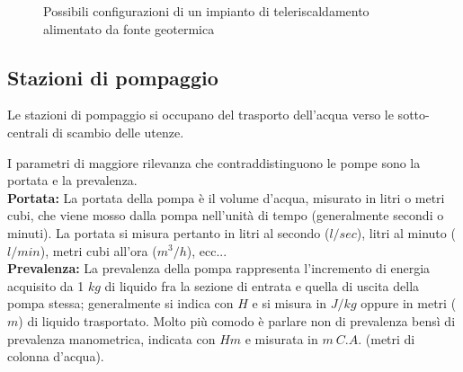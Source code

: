 \documentclass[laurea,oneside,11pt]{USiena_tesiLM}
\begin{document}
 \begin{figure}[!ht]
 \centering
 \hspace{5mm}
 \caption{Possibili configurazioni di un impianto di teleriscaldamento alimentato da fonte geotermica}
 \end{figure}

\subsection{Stazioni di pompaggio}
Le stazioni di pompaggio si occupano del trasporto dell'acqua verso le sotto-centrali di scambio delle utenze.
 
I parametri di maggiore rilevanza che contraddistinguono le pompe sono la portata e la prevalenza.\\
\textbf{Portata:} La portata della pompa è il volume d'acqua, misurato in litri o metri cubi, che viene mosso dalla pompa nell'unità di tempo (generalmente secondi o minuti). La portata si misura pertanto in litri al secondo ($l/sec$), litri al minuto ($l/min$), metri cubi all'ora ($m^3/h$), ecc...\\
\textbf{Prevalenza:} La prevalenza della pompa rappresenta l'incremento di energia acquisito da 1 $kg$ di liquido fra la sezione di entrata e quella di uscita della pompa stessa; generalmente si indica con $H$ e si misura in $J/kg$ oppure in metri ($m$) di liquido trasportato. Molto più comodo è parlare non di prevalenza bensì di prevalenza manometrica, indicata con $Hm$ e misurata in $m \ C.A.$ (metri di colonna d'acqua).
\end{document}
